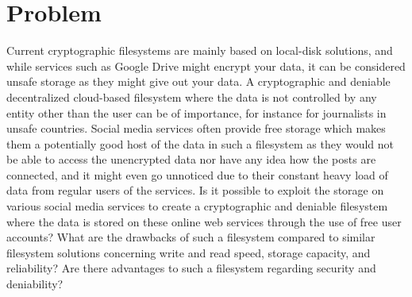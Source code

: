 
\section{Problem}
\label{sec:problem}

Current cryptographic filesystems are mainly based on \mbox{local-disk} solutions, and while services such as Google Drive might encrypt your data, it can be considered unsafe storage as they might give out your data. A cryptographic and deniable decentralized \mbox{cloud-based} filesystem where the data is not controlled by any entity other than the user can be of importance, for instance for journalists in unsafe countries. Social media services often provide free storage which makes them a potentially good host of the data in such a filesystem as they would not be able to access the unencrypted data nor have any idea how the posts are connected, and it might even go unnoticed due to their constant heavy load of data from regular users of the services. Is it possible to exploit the storage on various social media services to create a cryptographic and deniable filesystem where the data is stored on these online web services through the use of free user accounts? What are the drawbacks of such a filesystem compared to similar filesystem solutions concerning write and read speed, storage capacity, and reliability? Are there advantages to such a filesystem regarding security and deniability? 



